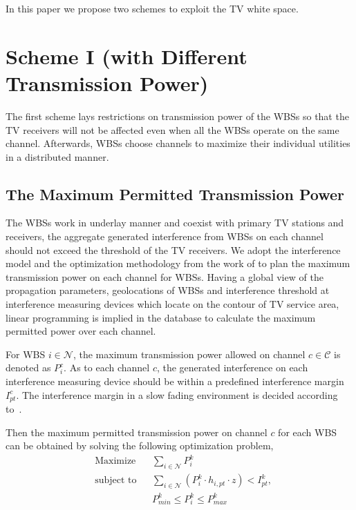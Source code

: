 \documentclass[times]{ettauth}
\theoremstyle{mytheoremstyle}
\theoremstyle{mytheoremstyle}
\theoremstyle{mytheoremstyle}
\begin{document}

In this paper we propose two schemes to exploit the TV white space.
\section{Scheme I (with Different Transmission Power)}
The first scheme lays restrictions on transmission power of the WBSs so that the TV receivers will not be affected even when all the WBSs operate on the same channel.
Afterwards, WBSs choose channels to maximize their individual utilities in a distributed manner.
\subsection{The Maximum Permitted Transmission Power}
\label{powermap}
The WBSs work in underlay manner and coexist with primary TV stations and receivers, the aggregate generated interference from WBSs on each channel should not exceed the threshold of the TV receivers.
We adopt the interference model and the optimization methodology from the work of \cite{multipleIntf_pimrc11} to plan the maximum transmission power on each channel for WBSs.
Having a global view of the propagation parameters, geolocations of WBSs and interference threshold at interference measuring devices which locate on the contour of TV service area, linear programming is implied in the database to calculate the maximum permitted power over each channel.

For WBS $i\in \mathcal{N}$, the maximum transmission power allowed on channel $c\in \mathcal{C}$ is denoted as $P_i^c$. 
As to each channel $c$, the generated interference on each interference measuring device should be within a predefined interference margin $I^c_{pt}$.
The interference margin in a slow fading environment is decided according to~\cite{aggregate_interference_shadow_fading_2010}.

Then the maximum permitted transmission power on channel $c$ for each WBS can be obtained by solving the following optimization problem,
	\begin{equation}
\label{lp}
		\begin{aligned}
		& {\text{Maximize}}
		& & \sum_{i\in \mathcal{N}} P^k_i \\
		& \text{subject to}
		& & \sum_{i\in \mathcal{N}} (P^k_i \cdot h_{i,pt}\cdot z) < I^k_{pt},\\
		& & & P_{min}^k \leq P_i^k \leq P_{max}^k
		\end{aligned}
	\end{equation}
	
\end{document}
